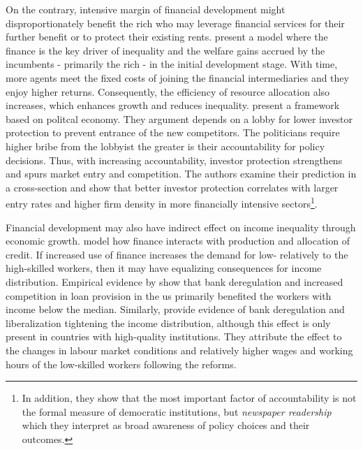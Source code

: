 \documentclass[a4paper,11pt]{article}
\begin{document}
On the contrary, intensive margin of financial development might disproportionately benefit the rich who may leverage financial services for their further benefit or to protect their existing rents. \citet{GreenwoodJovanovic1990} present a model where the finance is the key driver of inequality and the welfare gains accrued by the incumbents - primarily the rich - in the initial development stage. With time, more agents meet the fixed costs of joining the financial intermediaries and they enjoy higher returns. Consequently, the efficiency of resource allocation also increases, which enhances growth and reduces inequality. \citet{perotti2007investor} present a framework based on politcal economy. They argument depends on a lobby for lower investor protection to prevent entrance of the new competitors. The politicians require higher bribe from the lobbyist the greater is their accountability for policy decisions. Thus, with increasing accountability, investor protection strengthens and spurs market entry and competition. The authors examine their prediction in a cross-section and show that better investor protection correlates with larger entry rates and higher firm density in more financially intensive sectors\footnote{In addition, they show that the most important factor of accountability is not the formal measure of democratic institutions, but \emph{newspaper readership} which they interpret as broad awareness of policy choices and their outcomes.}. 

Financial development may also have indirect effect on income inequality through economic growth. \citet{townsendeueda2006} model how finance interacts with production and allocation of credit. If increased use of finance increases the demand for low- relatively to the high-skilled workers, then it may have equalizing consequences for income distribution. Empirical evidence by \citet{beck2010big} show that bank deregulation and increased competition in loan provision in the \ac{us} primarily benefited the workers with income below the median. Similarly, \citet{delis2014} provide evidence of bank deregulation and liberalization tightening the income distribution, although this effect is only present in countries with high-quality institutions. They attribute the effect to the changes in labour market conditions and relatively higher wages and working hours of the low-skilled workers following the reforms. 
\end{document}
